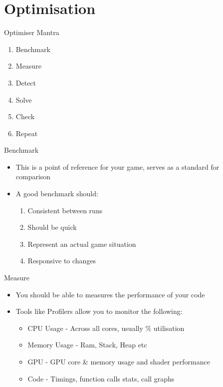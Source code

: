 \part{Optimisation}
\frame{\partpage}

\begin{frame}{Optimiser Mantra}
	\begin{enumerate}
		\pause \item Benchmark
		\pause \item Measure
		\pause \item Detect
		\pause \item Solve
		\pause \item Check
		\pause \item Repeat
	\end{enumerate}
\end{frame}

\begin{frame}{Benchmark}
	\begin{itemize}
		\pause \item This is a point of reference for your game, serves as a standard for comparison
		\pause \item A good benchmark should:
		\begin{enumerate}
			\pause \item Consistent between runs
			\pause \item Should be quick
			\pause \item Represent an actual game situation
			\pause \item Responsive to changes 
		\end{enumerate}
	\end{itemize}
\end{frame}

\begin{frame}{Measure}
	\begin{itemize}
		\pause \item You should be able to measures the performance of your code 
		\pause \item Tools like Profilers allow you to monitor the following:
		\begin{itemize}
			\pause \item CPU Usage - Across all cores, usually \% utilisation
			\pause \item Memory Usage - Ram, Stack, Heap etc
			\pause \item GPU - GPU core \& memory usage and shader performance
			\pause \item Code - Timings, function calls stats, call graphs
		\end{itemize}
	\end{itemize}
\end{frame}

